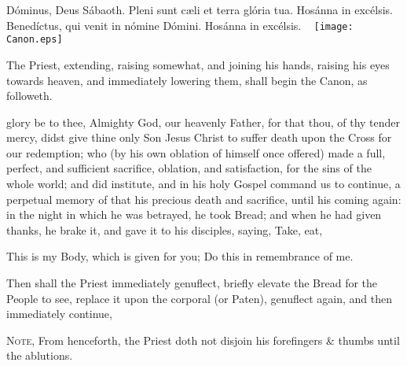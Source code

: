 

{ Dóminus, Deus Sábaoth. Pleni sunt c{\ae}li et terra glória tua. Hosánna in excélsis. Benedíctus, {} qui venit in nómine Dómini. Hosánna in excélsis.}
\clearpage
\checkoddpage
\ifoddpage \thispagestyle{empty}
~\clearpage\fi
\thispagestyle{empty}
\texttt{[image: Canon.eps]}
\setcounter{margcount}{1}
\clearpage
{}
\begin{rubric}
    The Priest, extending, raising somewhat, and joining his hands, raising his eyes towards heaven, and immediately lowering them, shall begin the Canon, as followeth.
\end{rubric}
 glory be to thee, Almighty God, our heavenly Father, for that thou, of thy tender mercy, didst give thine only Son Jesus Christ to suffer death upon the Cross for our redemption; who (by his own oblation of himself once offered) made a full, perfect, and sufficient sacrifice, oblation, and satisfaction, for the sins of the whole world; and did institute, and in his holy Gospel command us to continue, a perpetual memory of that his precious death and sacrifice, until his coming again:
\noindent
{} in the night in which he was betrayed, he took Bread; and when he had given {} thanks, he brake it, and gave it to his disciples, saying, Take, eat,
\begin{center}
\large{This is my Body, which is given for you; Do this in remembrance of me.}
\end{center}
\begin{rubric}
    Then shall the Priest immediately genuflect, briefly elevate the Bread for the People to see, replace it upon the corporal (or Paten), genuflect again, and then immediately continue,\par
    \textsc{Note,} From henceforth, the Priest doth not disjoin his forefingers \& thumbs until the ablutions.
\end{rubric}\par\noindent
